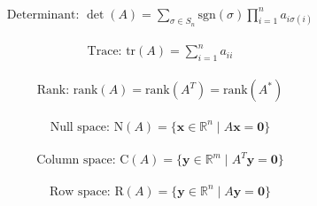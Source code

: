 \documentclass{config/homework}
\begin{document}
\[
\begin{array}{l}
    \text{Determinant: }
    \det(A) = \sum_{\sigma \in S_n} \text{sgn}(\sigma) \prod_{i=1}^n a_{i \sigma(i)}
\end{array}
\]

    \[
    \begin{array}{l}
        \text{Trace: }
        \text{tr}(A) = \sum_{i=1}^n a_{ii}
    \end{array}
    \]

    \[
    \begin{array}{l}
        \text{Rank: }
        \text{rank}(A) = \text{rank}(A^T) = \text{rank}(A^*)
    \end{array}
    \]

    \[
    \begin{array}{l}
        \text{Null space: }
        \text{N}(A) = \{ \mathbf{x} \in \mathbb{R}^n \mid A \mathbf{x} = \mathbf{0} \}
    \end{array}
    \]

    \[
    \begin{array}{l}
        \text{Column space: }
        \text{C}(A) = \{ \mathbf{y} \in \mathbb{R}^m \mid A^T \mathbf{y} = \mathbf{0} \}
    \end{array}
    \]

    \[
    \begin{array}{l}
        \text{Row space: }
        \text{R}(A) = \{ \mathbf{y} \in \mathbb{R}^n \mid A \mathbf{y} = \mathbf{0} \}
    \end{array}
    \]

    \newpage
\end{document}
